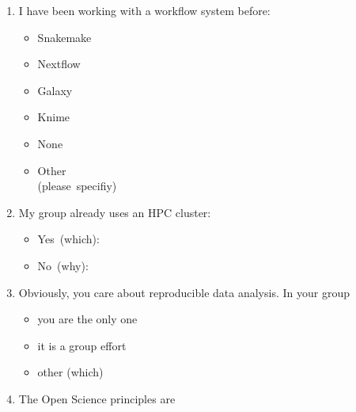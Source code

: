 \documentclass{scrartcl}
\begin{document}
\begin{enumerate}
\begin{multicols}{4}
\begin{itemize}[label={\Square}]
    \item Bash\\(or any other shell)
    \item C
    \item C++
    \item Fortran
    \item Python/Perl
    \item R
    \item Rust
    \item Matlab
    \item Java
    \item None
    \end{itemize}%
  \end{multicols}
\item I have been working with a workflow system before:
  \begin{multicols}{3}
    \begin{itemize}[label={\Square}]
    \item Snakemake
    \item Nextflow
    \item Galaxy
    \item Knime
    \item None
    \item Other\\(please\ specifiy)
    \end{itemize}
  \end{multicols}
\item My group already uses an HPC cluster:
    \begin{itemize}[label={\Square}]
      \item Yes\ (which): \dotfill
      \item No\ (why): \dotfill
    \end{itemize}
\item Obviously, you care about reproducible data analysis. In your group
  \begin{multicols}{3}
    \begin{itemize}[label={\Square}]
      \item you are the only one
      \item it is a group effort
      \item other (which)
    \end{itemize}
  \end{multicols}
\item The Open Science principles are
  \begin{multicols}{3}
    \begin{itemize}[label={\Square}]

\end{itemize}
\end{multicols}
\end{enumerate}
\end{document}

